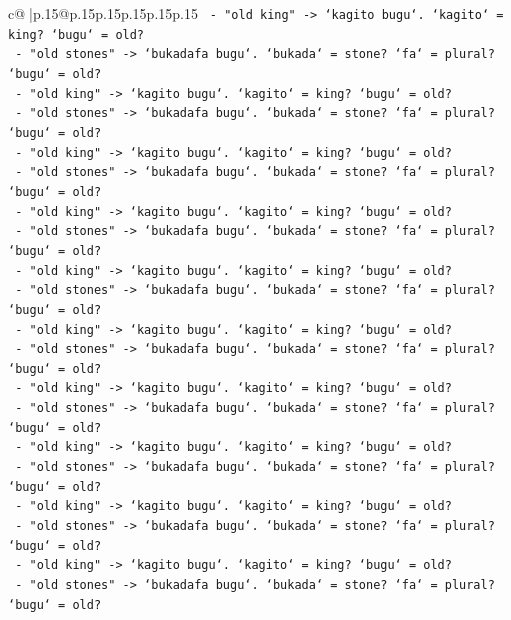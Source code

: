 \documentclass{article}
\begin{document}
{\begin{supertabular}{c@{$\;$}|p{.15\linewidth}@{}p{.15\linewidth}p{.15\linewidth}p{.15\linewidth}p{.15\linewidth}p{.15\linewidth}}
{{{\texttt{        {-} "old king" {-}> `kagito bugu`. `kagito` = king? `bugu` = old?} \\
\texttt{        {-} "old stones" {-}> `bukadafa bugu`. `bukada` = stone? `fa` = plural? `bugu` = old?} \\
\texttt{        {-} "old king" {-}> `kagito bugu`. `kagito` = king? `bugu` = old?} \\
\texttt{        {-} "old stones" {-}> `bukadafa bugu`. `bukada` = stone? `fa` = plural? `bugu` = old?} \\
\texttt{        {-} "old king" {-}> `kagito bugu`. `kagito` = king? `bugu` = old?} \\
\texttt{        {-} "old stones" {-}> `bukadafa bugu`. `bukada` = stone? `fa` = plural? `bugu` = old?} \\
\texttt{        {-} "old king" {-}> `kagito bugu`. `kagito` = king? `bugu` = old?} \\
\texttt{        {-} "old stones" {-}> `bukadafa bugu`. `bukada` = stone? `fa` = plural? `bugu` = old?} \\
\texttt{        {-} "old king" {-}> `kagito bugu`. `kagito` = king? `bugu` = old?} \\
\texttt{        {-} "old stones" {-}> `bukadafa bugu`. `bukada` = stone? `fa` = plural? `bugu` = old?} \\
\texttt{        {-} "old king" {-}> `kagito bugu`. `kagito` = king? `bugu` = old?} \\
\texttt{        {-} "old stones" {-}> `bukadafa bugu`. `bukada` = stone? `fa` = plural? `bugu` = old?} \\
\texttt{        {-} "old king" {-}> `kagito bugu`. `kagito` = king? `bugu` = old?} \\
\texttt{        {-} "old stones" {-}> `bukadafa bugu`. `bukada` = stone? `fa` = plural? `bugu` = old?} \\
\texttt{        {-} "old king" {-}> `kagito bugu`. `kagito` = king? `bugu` = old?} \\
\texttt{        {-} "old stones" {-}> `bukadafa bugu`. `bukada` = stone? `fa` = plural? `bugu` = old?} \\
\texttt{        {-} "old king" {-}> `kagito bugu`. `kagito` = king? `bugu` = old?} \\
\texttt{        {-} "old stones" {-}> `bukadafa bugu`. `bukada` = stone? `fa` = plural? `bugu` = old?} \\
\texttt{        {-} "old king" {-}> `kagito bugu`. `kagito` = king? `bugu` = old?} \\
\texttt{        {-} "old stones" {-}> `bukadafa bugu`. `bukada` = stone? `fa` = plural? `bugu` = old?} \\
}}}
\end{supertabular}}
\end{document}
